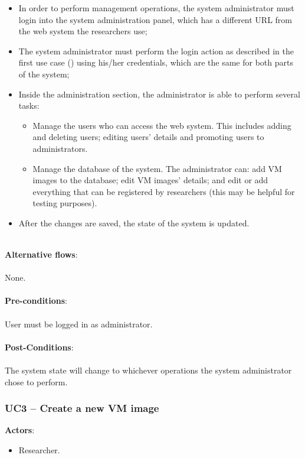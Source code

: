 \begin{itemize}
\item In order to perform management operations, the system administrator must login into the system administration panel, which has a different URL from the web system the researchers use;
\item The system administrator must perform the login action as described in the first use case () using his/her credentials, which are the same for both parts of the system;
\item Inside the administration section, the administrator is able to perform several tasks:
\begin{itemize}
\item Manage the users who can access the web system. This includes adding and deleting users; editing users' details and promoting users to administrators.
\item Manage the database of the system. The administrator can: add VM images to the database; edit VM images' details; and edit or add everything that can be registered by researchers (this may be helpful for testing purposes).
\end{itemize}
\item After the changes are saved, the state of the system is updated.
\end{itemize}

\ \\
\textbf{Alternative flows}:\\
\ \\
None.\\
\ \\
\textbf{Pre-conditions}:\\
\ \\
User must be logged in as administrator.\\
\ \\
\textbf{Post-Conditions}:\\
\ \\
The system state will change to whichever operations the system administrator chose to perform.

\subsubsection{UC3 -- Create a new VM image}\label{uc3}

\textbf{Actors}:

\begin{itemize}
\item Researcher.
\end{itemize}

